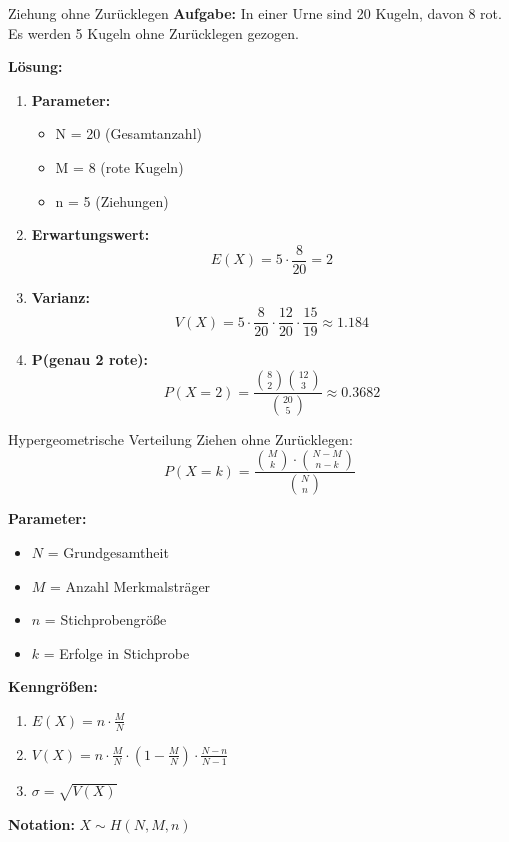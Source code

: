 \begin{example}{Ziehung ohne Zurücklegen}
\textbf{Aufgabe:} In einer Urne sind 20 Kugeln, davon 8 rot. Es werden 5 Kugeln ohne Zurücklegen gezogen. 

\textbf{Lösung:}
\begin{enumerate}
\item \textbf{Parameter:}
   \begin{itemize}
   \item N = 20 (Gesamtanzahl)
   \item M = 8 (rote Kugeln)
   \item n = 5 (Ziehungen)
   \end{itemize}

\item \textbf{Erwartungswert:}
   $$E(X) = 5 \cdot \frac{8}{20} = 2$$

\item \textbf{Varianz:}
   $$V(X) = 5 \cdot \frac{8}{20} \cdot \frac{12}{20} \cdot \frac{15}{19} \approx 1.184$$

\item \textbf{P(genau 2 rote):}
   $$P(X=2) = \frac{\binom{8}{2}\binom{12}{3}}{\binom{20}{5}} \approx 0.3682$$
\end{enumerate}
\end{example}

\begin{definition}{Hypergeometrische Verteilung}
Ziehen ohne Zurücklegen:
$$P(X=k)=\frac{\binom{M}{k} \cdot \binom{N-M}{n-k}}{\binom{N}{n}}$$

\textbf{Parameter:}
\begin{itemize}
    \item $N$ = Grundgesamtheit
    \item $M$ = Anzahl Merkmalsträger
    \item $n$ = Stichprobengröße
    \item $k$ = Erfolge in Stichprobe
\end{itemize}

\textbf{Kenngrößen:}
\begin{enumerate}
    \item $E(X) = n \cdot \frac{M}{N}$
    \item $V(X) = n \cdot \frac{M}{N} \cdot (1-\frac{M}{N}) \cdot \frac{N-n}{N-1}$
    \item $\sigma = \sqrt{V(X)}$
\end{enumerate}

\textbf{Notation:} $X \sim H(N,M,n)$
\end{definition}

